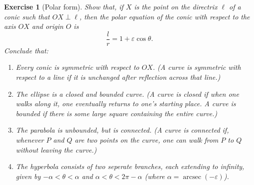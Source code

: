 \documentclass[a4paper,leqno,10pt]{article}
\theoremstyle{exercise}
\newtheorem{Exercise}{Exercise}
\newenvironment{exercise}
  {\begin{mdframed}\begin{Exercise}}
  {\end{Exercise}\end{mdframed}}
\theoremstyle{plain}
\theoremstyle{definition}
\theoremstyle{remark}
\DeclareMathOperator{\arcsec}{arcsec}
\begin{document}
\begin{exercise}[Polar form]
  Show that, if $ X $ is the point on the directrix $ \ell $ of a conic such that $ OX \perp \ell $, then the polar equation of the
  conic with respect to the axis $ OX $ and origin $ O $ is
  \begin{displaymath}
    \frac{l}{r} = 1 + \varepsilon \cos \theta.
  \end{displaymath}
  Conclude that:
  \begin{enumerate}
    \item Every conic is symmetric with respect to $ OX $. (A curve is symmetric with respect to a line if it is
          unchanged after reflection across that line.)
    \item The ellipse is a closed and bounded curve. (A curve is closed if when one walks along it, one eventually
          returns to one's starting place. A curve is bounded if there is some large square containing the entire curve.)
    \item The parabola is unbounded, but is connected. (A curve is connected if, whenever $ P $ and $ Q $ are two
          points on the curve, one can walk from $ P $ to $ Q $ without leaving the curve.)
    \item The hyperbola consists of two seperate branches, each extending to infinity, given by $ -\alpha < \theta < \alpha $
          and $ \alpha < \theta < 2\pi - \alpha $ (where $ \alpha = \arcsec(-\varepsilon) $).
  \end{enumerate}
\end{exercise}
\end{document}
